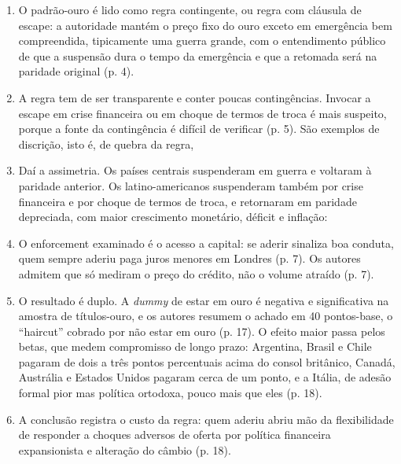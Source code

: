 \begin{enumerate}[leftmargin=*,nosep]
\item O padrão-ouro é lido como regra contingente, ou regra com cláusula de
escape: a autoridade mantém o preço fixo do ouro exceto em emergência bem
compreendida, tipicamente uma guerra grande, com o entendimento público de que
a suspensão dura o tempo da emergência e que a retomada será na paridade
original (p. 4).
\item A regra tem de ser transparente e conter poucas contingências. Invocar a
escape em crise financeira ou em choque de termos de troca é mais suspeito,
porque a fonte da contingência é difícil de verificar (p. 5). São exemplos de
discrição, isto é, de quebra da regra,
\item Daí a assimetria. Os países centrais suspenderam em guerra e voltaram à
paridade anterior. Os latino-americanos suspenderam também por crise financeira
e por choque de termos de troca, e retornaram em paridade depreciada, com maior
crescimento monetário, déficit e inflação:
\item O enforcement examinado é o acesso a capital: se aderir sinaliza boa
conduta, quem sempre aderiu paga juros menores em Londres (p. 7). Os autores
admitem que só mediram o preço do crédito, não o volume atraído (p. 7).
\item O resultado é duplo. A \emph{dummy} de estar em ouro é negativa e
significativa na amostra de títulos-ouro, e os autores resumem o achado em 40
pontos-base, o ``haircut'' cobrado por não estar em ouro (p. 17). O efeito maior
passa pelos betas, que medem compromisso de longo prazo: Argentina, Brasil e
Chile pagaram de dois a três pontos percentuais acima do consol britânico,
Canadá, Austrália e Estados Unidos pagaram cerca de um ponto, e a Itália, de
adesão formal pior mas política ortodoxa, pouco mais que eles (p. 18).
\item A conclusão registra o custo da regra: quem aderiu abriu mão da
flexibilidade de responder a choques adversos de oferta por política financeira
expansionista e alteração do câmbio (p. 18).
\end{enumerate}

